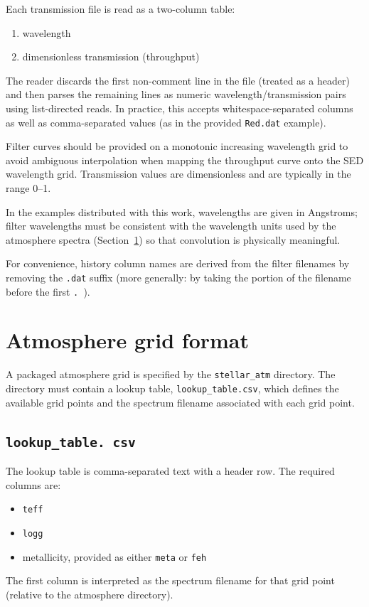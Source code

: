 \documentclass[linenumbers,apj,twocolumn, floatfix]{aastex701}
\begin{document}
Each transmission file is read as a two-column table: \begin{enumerate} \item wavelength \item dimensionless transmission (throughput) \end{enumerate} 

The reader discards the first non-comment line in the file (treated as a header) and then parses the remaining lines as numeric wavelength/transmission pairs using list-directed reads.
In practice, this accepts whitespace-separated columns as well as comma-separated values (as in the provided \texttt{Red.dat} example).

Filter curves should be provided on a monotonic increasing wavelength grid to avoid ambiguous interpolation when mapping the throughput curve onto the SED wavelength grid.
Transmission values are dimensionless and are typically in the range 0--1.

In the examples distributed with this work, wavelengths are given in Angstroms; filter wavelengths must be consistent with the wavelength units used by the atmosphere spectra (Section~\ref{sec:atm_grid_format}) so that convolution is physically meaningful.

For convenience, history column names are derived from the filter filenames by removing the \texttt{.dat} suffix (more generally: by taking the portion of the filename before the first \texttt{.
}).

\section{Atmosphere grid format}
\label{sec:atm_grid_format}

A packaged atmosphere grid is specified by the \texttt{stellar\_atm} directory.
The directory must contain a lookup table, \texttt{lookup\_table.csv}, which defines the available grid points and the spectrum filename associated with each grid point.

\subsection{\texttt{lookup\_table.
		csv}} 

The lookup table is comma-separated text with a header row.
The required columns are: \begin{itemize} \item \texttt{teff} \item \texttt{logg} \item metallicity, provided as either \texttt{meta} or \texttt{feh} \end{itemize} The first column is interpreted as the spectrum filename for that grid point (relative to the atmosphere directory).
\end{document}
